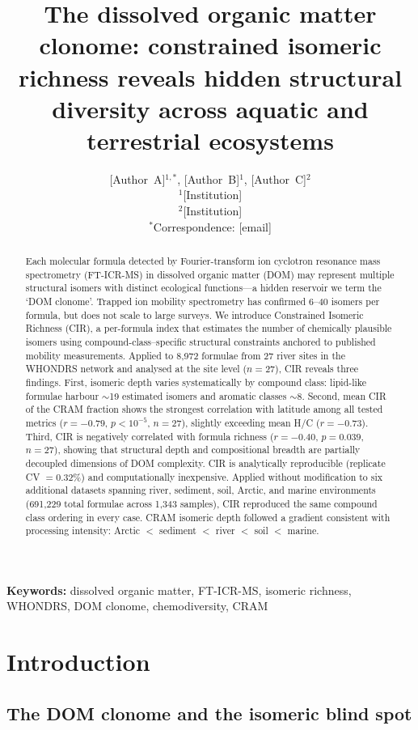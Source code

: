 \documentclass[12pt,letterpaper]{article}
\title{The dissolved organic matter clonome: constrained isomeric richness reveals hidden structural diversity across aquatic and terrestrial ecosystems}
\author{[Author~A]$^{1,*}$, [Author~B]$^{1}$, [Author~C]$^{2}$ \\
\small $^1$[Institution] \\
\small $^2$[Institution] \\
\small $^*$Correspondence: [email]}
\date{}
\begin{document}
\maketitle

\begin{abstract}
Each molecular formula detected by Fourier-transform ion cyclotron resonance mass spectrometry (FT-ICR-MS) in dissolved organic matter (DOM) may represent multiple structural isomers with distinct ecological functions---a hidden reservoir we term the `DOM clonome'. Trapped ion mobility spectrometry has confirmed 6--40 isomers per formula, but does not scale to large surveys. We introduce Constrained Isomeric Richness (CIR), a per-formula index that estimates the number of chemically plausible isomers using compound-class--specific structural constraints anchored to published mobility measurements. Applied to 8,972 formulae from 27 river sites in the WHONDRS network and analysed at the site level ($n = 27$), CIR reveals three findings. First, isomeric depth varies systematically by compound class: lipid-like formulae harbour $\sim$19 estimated isomers and aromatic classes $\sim$8. Second, mean CIR of the CRAM fraction shows the strongest correlation with latitude among all tested metrics ($r = -0.79$, $p < 10^{-5}$, $n = 27$), slightly exceeding mean H/C ($r = -0.73$). Third, CIR is negatively correlated with formula richness ($r = -0.40$, $p = 0.039$, $n = 27$), showing that structural depth and compositional breadth are partially decoupled dimensions of DOM complexity. CIR is analytically reproducible (replicate CV $= 0.32\%$) and computationally inexpensive. Applied without modification to six additional datasets spanning river, sediment, soil, Arctic, and marine environments (691,229 total formulae across 1,343 samples), CIR reproduced the same compound class ordering in every case. CRAM isomeric depth followed a gradient consistent with processing intensity: Arctic $<$ sediment $<$ river $<$ soil $<$ marine.
\end{abstract}

\noindent\textbf{Keywords:} dissolved organic matter, FT-ICR-MS, isomeric richness, WHONDRS, DOM clonome, chemodiversity, CRAM

\section{Introduction}

\subsection{The DOM clonome and the isomeric blind spot}
\end{document}

